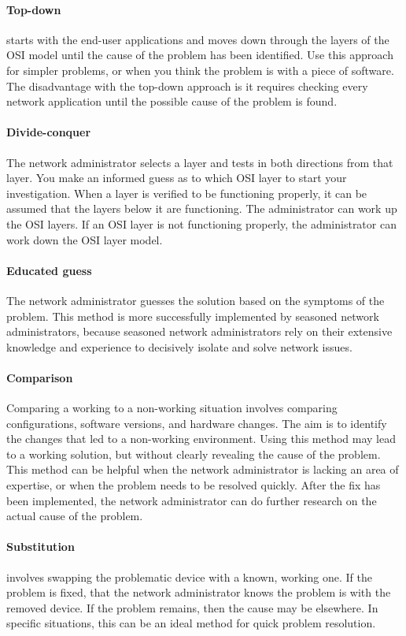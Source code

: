 \paragraph{Top-down}starts with the end-user applications and moves down through the layers of the OSI model until the cause of the problem has been identified. Use this approach for simpler problems, or when you think the problem is with a piece of software. The disadvantage with the top-down approach is it requires checking every network application until the possible cause of the problem is found.

\paragraph{Divide-conquer}The network administrator selects a layer and tests in both directions from that layer. You make an informed guess as to which OSI layer to start your investigation. When a layer is verified to be functioning properly, it can be assumed that the layers below it are functioning. The administrator can work up the OSI layers. If an OSI layer is not functioning properly, the administrator can work down the OSI layer model.

\paragraph{Educated guess}The network administrator guesses the solution based on the symptoms of the problem. This method is more successfully implemented by seasoned network administrators, because seasoned network administrators rely on their extensive knowledge and experience to decisively isolate and solve network issues. 

\paragraph{Comparison}Comparing a working to a non-working situation involves comparing configurations, software versions, and hardware changes. The aim is to identify the changes that led to a non-working environment. Using this method may lead to a working solution, but without clearly revealing the cause of the problem. This method can be helpful when the network administrator is lacking an area of expertise, or when the problem needs to be resolved quickly. After the fix has been implemented, the network administrator can do further research on the actual cause of the problem.

\paragraph{Substitution}involves swapping the problematic device with a known, working one. If the problem is fixed, that the network administrator knows the problem is with the removed device. If the problem remains, then the cause may be elsewhere. In specific situations, this can be an ideal method for quick problem resolution.


